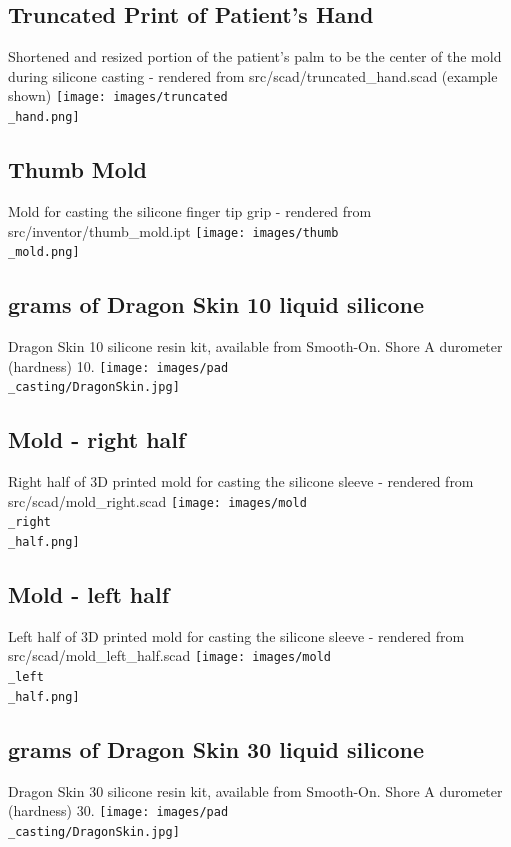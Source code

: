 \documentclass[11pt]{article}
\begin{document}
\hypertarget{thing_truncated\_hand}{\subsection{Truncated Print of Patient's Hand}}
Shortened and resized portion of the patient's palm to be the center of the mold during silicone casting - rendered from src/scad/truncated_hand.scad (example shown)
\texttt{[image: images/truncated\\\_hand.png]}

\hypertarget{thing_thumb\_mold}{\subsection{Thumb Mold}}
Mold for casting the silicone finger tip grip - rendered from src/inventor/thumb_mold.ipt
\texttt{[image: images/thumb\\\_mold.png]}

\hypertarget{thing_g\_dragon\_skin\_10}{\subsection{grams of Dragon Skin 10 liquid silicone}}
Dragon Skin 10 silicone resin kit, available from Smooth-On. Shore A durometer (hardness) 10.
\texttt{[image: images/pad\\\_casting/DragonSkin.jpg]}

\hypertarget{thing_mold\_right\_half}{\subsection{Mold - right half}}
Right half of 3D printed mold for casting the silicone sleeve - rendered from src/scad/mold_right.scad
\texttt{[image: images/mold\\\_right\\\_half.png]}

\hypertarget{thing_mold\_left\_half}{\subsection{Mold - left half}}
Left half of 3D printed mold for casting the silicone sleeve - rendered from src/scad/mold_left_half.scad
\texttt{[image: images/mold\\\_left\\\_half.png]}

\hypertarget{thing_g\_dragon\_skin\_30}{\subsection{grams of Dragon Skin 30 liquid silicone}}
Dragon Skin 30 silicone resin kit, available from Smooth-On. Shore A durometer (hardness) 30.
\texttt{[image: images/pad\\\_casting/DragonSkin.jpg]}
\end{document}
